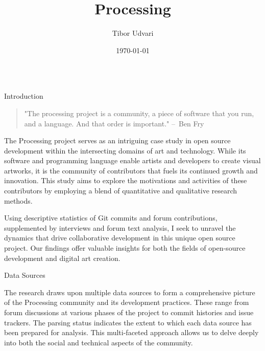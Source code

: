 \documentclass[final]{beamer}
\title{Processing}
\author{Tibor Udvari}
\institute{HEAD – Genève}
\date{\today}
\begin{document}
\begin{frame}[t]
  \begin{columns}[t]
    \begin{column}{.32\textwidth}
      \begin{block}{Introduction}
        \vspace{1.25em}
        \begin{quote}
          "The processing project is a community, a piece of software that you run, and a language. And that order is important." – Ben Fry \parencite[19:22]{artsatmit2017CASTSymposium2017}
          \end{quote}
          \vspace{0.75em}

          The Processing project serves as an intriguing case study in open source development within the intersecting domains of art and technology. While its software and programming language enable artists and developers to create visual artworks, it is the community of contributors that fuels its continued growth and innovation. This study aims to explore the motivations and activities of these contributors by employing a blend of quantitative and qualitative research methods. 
          \smallskip  %

          Using descriptive statistics of Git commits and forum contributions, supplemented by interviews and forum text analysis, I seek to unravel the dynamics that drive collaborative development in this unique open source project. Our findings offer valuable insights for both the fields of open-source development and digital art creation.
      \end{block}
      \begin{block}{Data Sources}
                
      \end{block}
      \smallskip  %
  
      The research draws upon multiple data sources to form a comprehensive picture of the Processing community and its development practices. These range from forum discussions at various phases of the project to commit histories and issue trackers. The parsing status indicates the extent to which each data source has been prepared for analysis. This multi-faceted approach allows us to delve deeply into both the social and technical aspects of the community.
    

\end{column}
\end{columns}
\end{frame}
\end{document}
